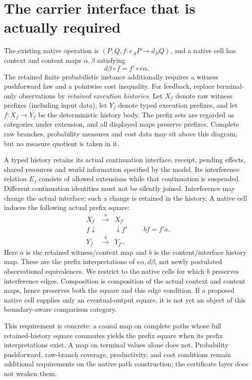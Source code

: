\documentclass[11pt]{article}
\begin{document}
\section{The carrier interface that is actually required}
The existing native operation is $(P,Q,f:e_A P\to d_BQ)$, and a native cell has context and content maps $\alpha,\beta$ satisfying
\[
 d\beta\circ f=f'\circ e\alpha.
\]
The retained finite probabilistic instance additionally requires a witness pushforward law and a pointwise cost inequality. For feedback, replace terminal-only observations by \emph{retained execution histories}. Let $X_f$ denote raw witness prefixes (including input data), let $Y_f$ denote typed execution prefixes, and let $f:X_f\to Y_f$ be the deterministic history body. The prefix sets are regarded as categories under extension, and all displayed maps preserve prefixes. Complete raw branches, probability measures and cost data may sit above this diagram, but no measure quotient is taken in it.

A typed history retains its actual continuation interface, receipt, pending effects, shared resources and world information specified by the model. Its interference relation $E_f$ consists of allowed extensions while that continuation is suspended. Different continuation identities must not be silently joined. Interference may change the actual interface; such a change is retained in the history. A native cell induces the following actual prefix square:
\[
\begin{array}{ccc}
 X_f&\xrightarrow{a}&X_{f'}\\
 f\downarrow&&\downarrow f'\\
 Y_f&\xrightarrow{b}&Y_{f'}.
\end{array}
\qquad b f=f'a.
\]
Here $a$ is the retained witness/context map and $b$ is the content/interface history map. These are the prefix interpretations of $e\alpha,d\beta$, not newly postulated observational equivalences. We restrict to the native cells for which $b$ preserves interference edges. Composition is composition of the actual context and content maps, hence preserves both the square and this edge condition. If a proposed native cell supplies only an eventual-output square, it is not yet an object of this boundary-aware comparison category.

This requirement is concrete: a causal map on complete paths whose full retained-history square commutes yields the prefix square when its prefix interpretations exist. A map on terminal values alone does not. Probability pushforward, raw-branch coverage, productivity, and cost conditions remain additional requirements on the native path construction; the certificate layer does not weaken them.
\end{document}
